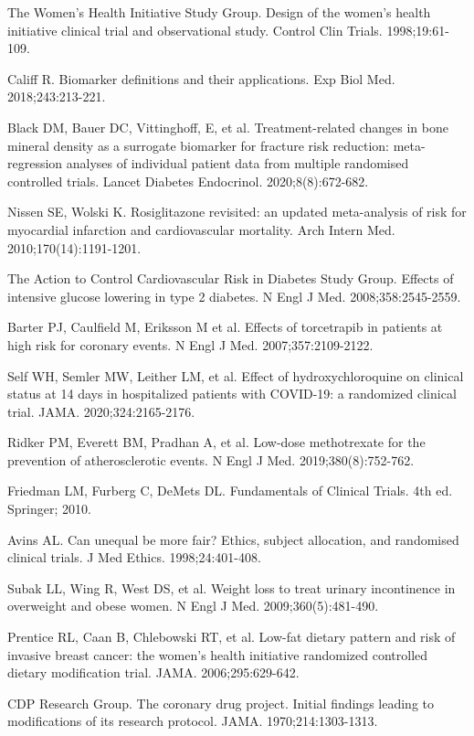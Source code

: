 \begin{references}
\item The Women’s Health Initiative Study Group. Design of the women’s health initiative clinical trial and observational study. Control Clin Trials. 1998;19:61-109.
\item Califf R. Biomarker definitions and their applications. Exp Biol Med. 2018;243:213-221.
\item Black DM, Bauer DC, Vittinghoff, E, et al. Treatment-related changes in bone mineral density as a surrogate biomarker for fracture risk reduction: meta-regression analyses of individual patient data from multiple randomised controlled trials. Lancet Diabetes Endocrinol. 2020;8(8):672-682.
\item Nissen SE, Wolski K. Rosiglitazone revisited: an updated meta-analysis of risk for myocardial infarction and cardiovascular mortality. Arch Intern Med. 2010;170(14):1191-1201.
\item The Action to Control Cardiovascular Risk in Diabetes Study Group. Effects of intensive glucose lowering in type 2 diabetes. N Engl J Med. 2008;358:2545-2559.
\item Barter PJ, Caulfield M, Eriksson M et al. Effects of torcetrapib in patients at high risk for coronary events. N Engl J Med. 2007;357:2109-2122.
\item Self WH, Semler MW, Leither LM, et al. Effect of hydroxychloroquine on clinical status at 14 days in hospitalized patients with COVID-19: a randomized clinical trial. JAMA. 2020;324:2165-2176.
\item Ridker PM, Everett BM, Pradhan A, et al. Low-dose methotrexate for the prevention of atherosclerotic events. N Engl J Med. 2019;380(8):752-762.
\item Friedman LM, Furberg C, DeMets DL. Fundamentals of Clinical Trials. 4th ed. Springer; 2010.
\item Avins AL. Can unequal be more fair? Ethics, subject allocation, and randomised clinical trials. J Med Ethics. 1998;24:401-408.
\item Subak LL, Wing R, West DS, et al. Weight loss to treat urinary incontinence in overweight and obese women. N Engl J Med. 2009;360(5):481-490.
\item Prentice RL, Caan B, Chlebowski RT, et al. Low-fat dietary pattern and risk of invasive breast cancer: the women’s health initiative randomized controlled dietary modification trial. JAMA. 2006;295:629-642.
\item CDP Research Group. The coronary drug project. Initial findings leading to modifications of its research protocol. JAMA. 1970;214:1303-1313.

\end{references}

